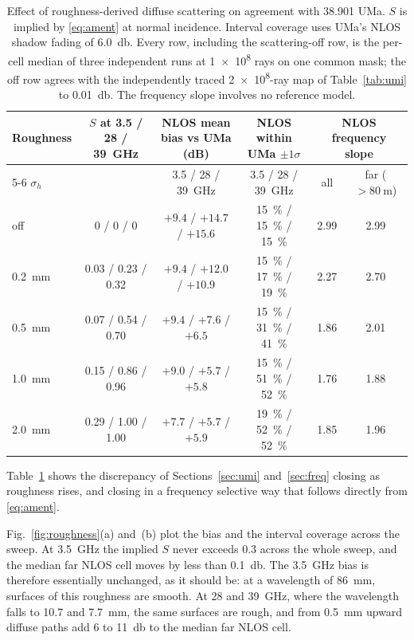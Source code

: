 \documentclass[conference]{IEEEtran}
\begin{document}
\begin{table}[t]
\caption{Effect of roughness-derived diffuse scattering on agreement with
38.901 UMa. $S$ is implied by \eqref{eq:ament} at normal incidence. Interval
coverage uses UMa's NLOS shadow fading of \SI{6.0}{\decibel}. Every row,
including the scattering-off row, is the per-cell median of three independent
runs at \num{1e8} rays on one common mask; the off row agrees with the
independently traced \num{2e8}-ray map of Table~\ref{tab:umi} to
\SI{0.01}{\decibel}. The frequency slope involves no reference model.}
\label{tab:roughness}
\centering
\small
\begin{tabular}{lccccc}
\toprule
Roughness & $S$ at 3.5 / 28 / \SI{39}{\giga\hertz} & NLOS mean bias vs UMa (dB) & NLOS within UMa $\pm 1\sigma$ & \multicolumn{2}{c}{NLOS frequency slope} \\
\cmidrule(lr){5-6}
$\sigma_h$ &                                        & 3.5 / 28 / \SI{39}{\giga\hertz} & 3.5 / 28 / \SI{39}{\giga\hertz} & all & far ($>\SI{80}{\metre}$) \\
\midrule
off                    & 0 / 0 / 0            & $+9.4$ / $+14.7$ / $+15.6$ & \SI{15}{\percent} / \SI{15}{\percent} / \SI{15}{\percent} & 2.99 & 2.99 \\
\SI{0.2}{\milli\metre} & 0.03 / 0.23 / 0.32   & $+9.4$ / $+12.0$ / $+10.9$ & \SI{15}{\percent} / \SI{17}{\percent} / \SI{19}{\percent} & 2.27 & 2.70 \\
\SI{0.5}{\milli\metre} & 0.07 / 0.54 / 0.70   & $+9.4$ / $+7.6$ / $+6.5$   & \SI{15}{\percent} / \SI{31}{\percent} / \SI{41}{\percent} & 1.86 & 2.01 \\
\SI{1.0}{\milli\metre} & 0.15 / 0.86 / 0.96   & $+9.0$ / $+5.7$ / $+5.8$   & \SI{15}{\percent} / \SI{51}{\percent} / \SI{52}{\percent} & 1.76 & 1.88 \\
\SI{2.0}{\milli\metre} & 0.29 / 1.00 / 1.00   & $+7.7$ / $+5.7$ / $+5.9$   & \SI{19}{\percent} / \SI{52}{\percent} / \SI{52}{\percent} & 1.85 & 1.96 \\
\bottomrule
\end{tabular}
\end{table}

Table~\ref{tab:roughness} shows the discrepancy of Sections~\ref{sec:umi}
and~\ref{sec:freq} closing as roughness rises, and closing in a frequency
selective way that follows directly from \eqref{eq:ament}.

Fig.~\ref{fig:roughness}(a) and~(b) plot the bias and the interval coverage
across the sweep. At \SI{3.5}{\giga\hertz} the implied $S$ never exceeds
\num{0.3} across the whole sweep, and the median far NLOS cell moves by less than
\SI{0.1}{\decibel}. The \SI{3.5}{\giga\hertz} bias is therefore essentially
unchanged, as it should be: at a wavelength of \SI{86}{\milli\metre}, surfaces
of this roughness are smooth. At \SI{28}{} and \SI{39}{\giga\hertz}, where the
wavelength falls to \SI{10.7}{} and \SI{7.7}{\milli\metre}, the same surfaces
are rough, and from \SI{0.5}{\milli\metre} upward diffuse paths add \SI{6}{} to
\SI{11}{\decibel} to the median far NLOS cell.
\end{document}
